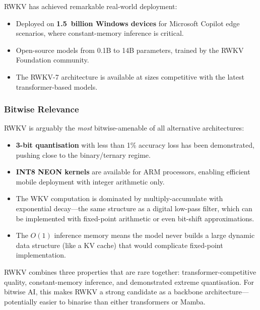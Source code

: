 RWKV has achieved remarkable real-world deployment:

\begin{itemize}[leftmargin=2em]
  \item Deployed on \textbf{1.5~billion Windows devices} for
    Microsoft Copilot edge scenarios, where constant-memory inference
    is critical.
  \item Open-source models from 0.1B to 14B parameters, trained by
    the RWKV Foundation community.
  \item The RWKV-7 architecture is available at sizes competitive
    with the latest transformer-based models.
\end{itemize}

\subsubsection{Bitwise Relevance}

RWKV is arguably the \emph{most} bitwise-amenable of all
alternative architectures:

\begin{itemize}[leftmargin=2em]
  \item \textbf{3-bit quantisation} with less than 1\% accuracy
    loss has been demonstrated, pushing close to the
    binary/ternary regime.
  \item \textbf{INT8 NEON kernels} are available for ARM
    processors, enabling efficient mobile deployment with integer
    arithmetic only.
  \item The WKV computation is dominated by multiply-accumulate
    with exponential decay---the same structure as a digital
    low-pass filter, which can be implemented with fixed-point
    arithmetic or even bit-shift approximations.
  \item The $O(1)$ inference memory means the model never builds a
    large dynamic data structure (like a KV cache) that would
    complicate fixed-point implementation.
\end{itemize}

\begin{keyinsight}
RWKV combines three properties that are rare together: transformer-competitive
quality, constant-memory inference, and demonstrated extreme
quantisation. For bitwise AI, this makes RWKV a strong candidate as
a backbone architecture---potentially easier to binarise than either
transformers or Mamba.
\end{keyinsight}

